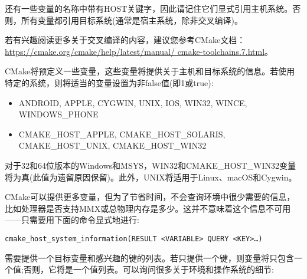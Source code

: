 还有一些变量的名称中带有HOST关键字，因此请记住它们显式引用主机系统。否则，所有变量都引用目标系统(通常是宿主系统，除非交叉编译)。

若有兴趣阅读更多关于交叉编译的内容，建议您参考CMake文档：\url{https://cmake.org/cmake/help/latest/manual/ cmake-toolchains.7.html}。


CMake将预定义一些变量，这些变量将提供关于主机和目标系统的信息。若使用特定的系统，则将适当的变量设置为非false值(即1或true):

\begin{itemize}
\item 
ANDROID, APPLE, CYGWIN, UNIX, IOS, WIN32, WINCE, WINDOWS\_PHONE

\item 
CMAKE\_HOST\_APPLE, CMAKE\_HOST\_SOLARIS, CMAKE\_HOST\_UNIX, CMAKE\_HOST\_WIN32
\end{itemize}

对于32和64位版本的Windows和MSYS，WIN32和CMAKE\_HOST\_WIN32变量将为真(此值为遗留原因保留)。此外，UNIX将适用于Linux、macOS和Cygwin。


CMake可以提供更多变量，但为了节省时间，不会查询环境中很少需要的信息，比如处理器是否支持MMX或总物理内存是多少。这并不意味着这个信息不可用——只需要用下面的命令显式地进行:

\begin{lstlisting}[style=styleCMake]
cmake_host_system_information(RESULT <VARIABLE> QUERY <KEY>…)
\end{lstlisting}

需要提供一个目标变量和感兴趣的键的列表。若只提供一个键，则变量将只包含一个值;否则，它将是一个值列表。可以询问很多关于环境和操作系统的细节:

